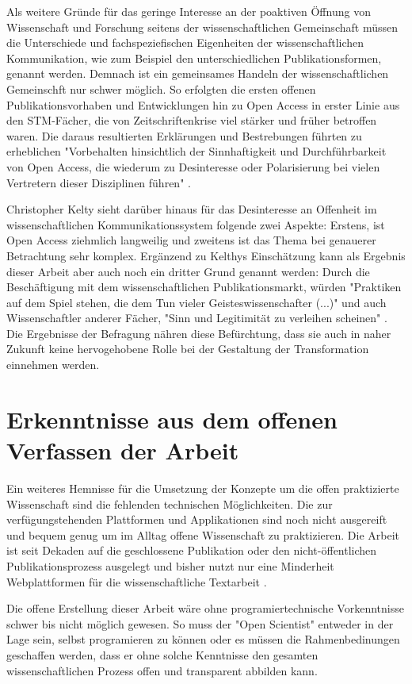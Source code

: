 Als weitere Gründe für das geringe Interesse an der poaktiven Öffnung von Wissenschaft und Forschung seitens der wissenschaftlichen Gemeinschaft müssen die Unterschiede und fachspeziefischen Eigenheiten der wissenschaftlichen Kommunikation, wie zum Beispiel den unterschiedlichen Publikationsformen, genannt werden. Demnach ist ein gemeinsames Handeln der wissenschaftlichen Gemeinschft nur schwer möglich. So erfolgten die ersten offenen Publikationsvorhaben und Entwicklungen hin zu Open Access in erster Linie aus den STM-Fächer, die von Zeitschriftenkrise viel stärker und früher betroffen waren. Die daraus resultierten Erklärungen und Bestrebungen führten zu erheblichen "Vorbehalten hinsichtlich der Sinnhaftigkeit und Durchführbarkeit von Open Access, die wiederum zu Desinteresse oder Polarisierung bei vielen Vertretern dieser Disziplinen führen" \cite{naeder_2010_open}.

Christopher Kelty sieht darüber hinaus für das Desinteresse an Offenheit im wissenschaftlichen Kommunikationssystem folgende zwei Aspekte: Erstens, ist Open Access ziehmlich langweilig und zweitens ist das Thema bei genauerer Betrachtung sehr komplex. Ergänzend zu Kelthys Einschätzung kann als Ergebnis dieser Arbeit aber auch noch ein dritter Grund genannt werden: Durch die Beschäftigung mit dem wissenschaftlichen Publikationsmarkt, würden "Praktiken auf dem Spiel stehen, die dem Tun vieler Geisteswissenschafter (...)" und auch Wissenschaftler anderer Fächer, "Sinn und Legitimität zu verleihen scheinen" \cite{Hirschi_2015_buch_oa}. Die Ergebnisse der Befragung nähren diese Befürchtung, dass sie auch in naher Zukunft keine hervogehobene Rolle bei der Gestaltung der Transformation einnehmen werden.

\section{Erkenntnisse aus dem offenen Verfassen der Arbeit}

Ein weiteres Hemnisse für die Umsetzung der Konzepte um die offen praktizierte Wissenschaft sind die fehlenden technischen Möglichkeiten. Die zur verfügungstehenden Plattformen und Applikationen sind noch nicht ausgereift und bequem genug um im Alltag offene Wissenschaft zu praktizieren. Die Arbeit ist seit Dekaden auf die geschlossene Publikation oder den nicht-öffentlichen Publikationsprozess ausgelegt und bisher nutzt nur eine Minderheit Webplattformen für die wissenschaftliche Textarbeit \cite{Perkel_2014}.

Die offene Erstellung dieser Arbeit wäre ohne programiertechnische Vorkenntnisse schwer bis nicht möglich gewesen. So muss der "Open Scientist" entweder in der Lage sein, selbst programieren zu können oder es müssen die Rahmenbedinungen geschaffen werden, dass er ohne solche Kenntnisse den gesamten wissenschaftlichen Prozess offen und transparent abbilden kann.

